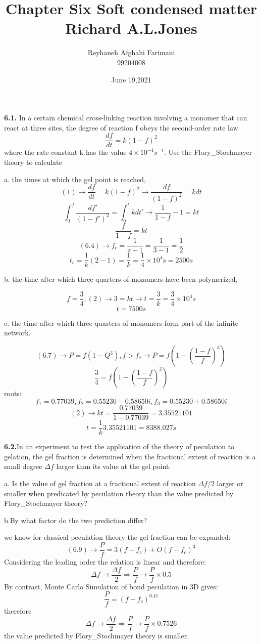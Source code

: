 \documentclass[a4paper,12pt]{report}
\title{\large{\textbf{ Chapter Six Soft condensed matter\\ Richard A.L.Jones}}}
\author{Reyhaneh Afghahi Farimani\\ 99204008}
\date{June 19,2021}
\begin{document}
\maketitle
\textbf{6.1.} In a certain chemical cross-linking reaction involving a monomer that can react at three sites,
 the degree of reaction f obeys the second-order rate law
\begin{equation} 
\frac{df}{dt} = k (1-f)^2
\end{equation}
where the rate constant k has the value $ 4 \times 10^{-4} s^{-1}$. Use the Flory\_Stochmayer  theory to calculate

a. the times at which the gel point is reached,
\[
(1) \to \frac{df}{dt} = k (1-f)^2 \to \frac{df}{(1-f)^2} = kdt
\]
\[
\int_{0}^{f} \frac{df'}{(1-f')^2} = \int_{0}^{t} kdt' \to \frac{1}{1-f} - 1 = kt
\]
\begin{equation} 
	\frac{f}{1-f} = kt
\end{equation}
\[
(6.4) \to f_c = \frac{1}{z-1} = \frac{1}{3-1} = \frac{1}{2}
\]
\[
t_c = \frac{1}{k} (2-1) = \frac{1}{k} = \frac{1}{4} \times 10^4 s = 2500s
\]

b. the time after which three quarters of monomers have been polymerized,

\[
f = \frac{3}{4} , (2) \to 3 = kt \to t = \frac{3}{k} = \frac{3}{4} \times 10^4 s 
\]
\[
t = 7500s
\]

c. the time after which three quarters of monomers form part of the infinite network.

\[
(6.7) \to P = f(1 - Q^3) , f>f_c \to P = f(1 - (\frac{1-f}{f})^3)
\]
\[
\frac{3}{4} = f(1 - (\frac{1-f}{f})^3)
\]
roots:
\[
f_1 =0.77039,f_2 =0.55230 - 0.58650 i, f_3 = 0.55230 + 0.58650 i
\]
\[
(2)\to kt = \frac{0.77039}{1-0.77039}=3.35521101
\]
\[
t = \frac{1}{k}3.35521101  = 8388.027s
\]

\textbf{6.2.}In an experiment to test the application of the theory of peculation to gelation,
 the gel fraction is determined when the fractional extent of reaction is a small degree
  $\Delta f$ larger than its value at the gel point.

a. Is the value of gel fraction at a fractional extent of reaction $\Delta f/2$
 larger or smaller when predicated by peculation theory than
  the value predicted by Flory\_Stochmayer theory?

b.By what factor do the two prediction differ?

we know for classical peculation theory the gel fraction can be expanded:
\[
(6.9) \to \frac{P}{f} = 3(f-f_c) + O(f-f_c)^3
\]
Considering the leading order the relation is linear and therefore:
\[
\Delta f \to \frac{\Delta f}{2} \Rightarrow \frac{P}{f} \to \frac{P}{f}\times0.5
\] 
By contrast, Monte Carlo Simulation of bond peculation in 3D gives:
\[
\frac{P}{f} = (f-f_c)^{0.41}
\]
therefore
\[
\Delta f \to \frac{\Delta f}{2} \Rightarrow \frac{P}{f} \to \frac{P}{f}\times0.7526
\]
the value predicted by Flory\_Stochmayer theory is smaller.
\end{document}

